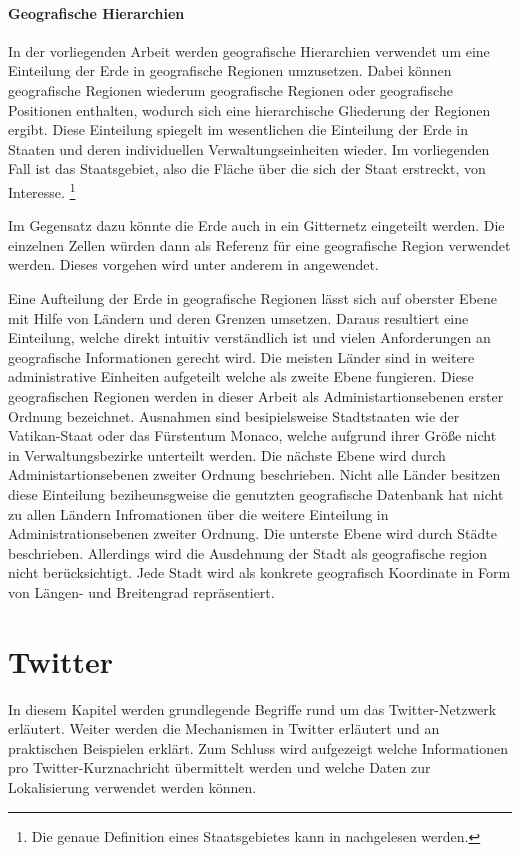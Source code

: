 		\paragraph*{Geografische Hierarchien}
		In der vorliegenden Arbeit werden geografische Hierarchien verwendet um eine Einteilung der Erde in geografische Regionen umzusetzen.
		Dabei können geografische Regionen wiederum geografische Regionen oder geografische Positionen enthalten, wodurch sich eine hierarchische Gliederung der Regionen ergibt.
		Diese Einteilung spiegelt im wesentlichen die Einteilung der Erde in Staaten und deren individuellen Verwaltungseinheiten wieder.
		Im vorliegenden Fall ist das Staatsgebiet, also die Fläche über die sich der Staat erstreckt, von Interesse. \footnote{Die genaue Definition eines Staatsgebietes kann in \cite{jellinek1921} nachgelesen werden.} 

		Im Gegensatz dazu könnte die Erde auch in ein Gitternetz eingeteilt werden. 
		Die einzelnen Zellen würden dann als Referenz für eine geografische Region verwendet werden.
		Dieses vorgehen wird unter anderem in \cite{Serdyukov2009} angewendet.

		Eine Aufteilung der Erde in geografische Regionen lässt sich auf oberster Ebene mit Hilfe von Ländern und deren Grenzen umsetzen. 
		Daraus resultiert eine Einteilung, welche direkt intuitiv verständlich ist und vielen Anforderungen an geografische Informationen gerecht wird.
		Die meisten Länder sind in weitere administrative Einheiten aufgeteilt welche als zweite Ebene fungieren.
		Diese geografischen Regionen werden in dieser Arbeit als Administartionsebenen erster Ordnung bezeichnet.   
		Ausnahmen sind besipielsweise Stadtstaaten wie der Vatikan-Staat oder das Fürstentum Monaco, welche aufgrund ihrer Größe nicht in Verwaltungsbezirke unterteilt werden. 
		Die nächste Ebene wird durch Administartionsebenen zweiter Ordnung beschrieben. 
		Nicht alle Länder besitzen diese Einteilung beziheunsgweise die genutzten geografische Datenbank hat nicht zu allen Ländern Infromationen über die weitere Einteilung in Administrationsebenen zweiter Ordnung.
		Die unterste Ebene wird durch Städte beschrieben. 
		Allerdings wird die Ausdehnung der Stadt als geografische region nicht berücksichtigt.
		Jede Stadt wird als konkrete geografisch Koordinate in Form von Längen- und Breitengrad repräsentiert. 

	\section{Twitter} 
	In diesem Kapitel werden grundlegende Begriffe rund um das Twitter-Netzwerk erläutert. 
	Weiter werden die Mechanismen in Twitter erläutert und an praktischen Beispielen erklärt. 
	Zum Schluss wird aufgezeigt welche Informationen pro Twitter-Kurznachricht übermittelt werden und welche Daten zur Lokalisierung verwendet werden können.

